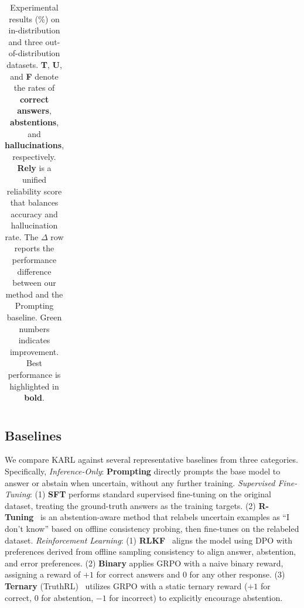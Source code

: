 \documentclass{article} %
\newcommand{\framename}{\textsc{KARL}}
\begin{document}
\begin{table}[t]
{\begin{tabular}{l cccc cccc cccc cccc}
    \bottomrule
    \end{tabular}
}
\vspace{2mm}
\caption{
Experimental results (\%) on in-distribution and three out-of-distribution datasets. \textbf{T}, \textbf{U}, and \textbf{F} denote the rates of \textbf{correct answers}, \textbf{abstentions}, and \textbf{hallucinations}, respectively. \textcolor{red!60!black}{\textbf{Rely}} is a unified reliability score that balances accuracy and hallucination rate.
The $\Delta$ row reports the performance difference between our method and the Prompting baseline. \textcolor{green!60!black}{Green} numbers indicates improvement. Best performance is highlighted in \textbf{bold}.
}
\label{tab:main_results}
\end{table}


\subsection{Baselines}
\label{sec:baselines}
We compare \framename{} against several representative baselines from three categories. Specifically,
\textit{Inference-Only}: \textbf{Prompting} directly prompts the base model to answer or abstain when uncertain, without any further training.
\textit{Supervised Fine-Tuning}:
(1) \textbf{SFT} performs standard supervised fine-tuning on the original dataset, treating the ground-truth answers as the training targets.
(2) \textbf{R-Tuning}~\cite{R-Tuning} is an abstention-aware method that relabels uncertain examples as ``I don't know'' based on offline consistency probing, then fine-tunes on the relabeled dataset.
\textit{Reinforcement Learning}:
(1) \textbf{RLKF}~\cite{Rejection_Improves_Reliability} aligns the model using DPO with preferences derived from offline sampling consistency to align answer, abstention, and error preferences.
(2) \textbf{Binary} applies GRPO with a naive binary reward, assigning a reward of $+1$ for correct answers and $0$ for any other response.
(3) \textbf{Ternary} (TruthRL)~\citep{truthrl} utilizes GRPO with a static ternary reward ($+1$ for correct, $0$ for abstention, $-1$ for incorrect) to explicitly encourage abstention.
\end{document}
